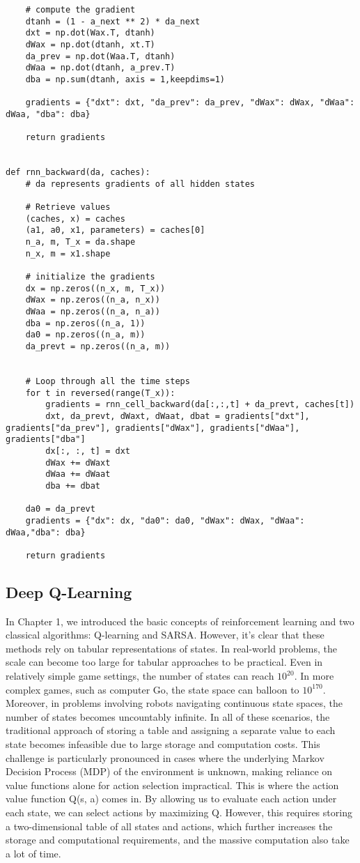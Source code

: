 \documentclass{article}
\begin{document}
\begin{lstlisting}
    # compute the gradient
    dtanh = (1 - a_next ** 2) * da_next
    dxt = np.dot(Wax.T, dtanh)
    dWax = np.dot(dtanh, xt.T)
    da_prev = np.dot(Waa.T, dtanh)
    dWaa = np.dot(dtanh, a_prev.T)
    dba = np.sum(dtanh, axis = 1,keepdims=1)

    gradients = {"dxt": dxt, "da_prev": da_prev, "dWax": dWax, "dWaa": dWaa, "dba": dba}

    return gradients


def rnn_backward(da, caches):
    # da represents gradients of all hidden states

    # Retrieve values
    (caches, x) = caches
    (a1, a0, x1, parameters) = caches[0]
    n_a, m, T_x = da.shape
    n_x, m = x1.shape

    # initialize the gradients
    dx = np.zeros((n_x, m, T_x))
    dWax = np.zeros((n_a, n_x))
    dWaa = np.zeros((n_a, n_a))
    dba = np.zeros((n_a, 1))
    da0 = np.zeros((n_a, m))
    da_prevt = np.zeros((n_a, m))


    # Loop through all the time steps
    for t in reversed(range(T_x)):
        gradients = rnn_cell_backward(da[:,:,t] + da_prevt, caches[t])
        dxt, da_prevt, dWaxt, dWaat, dbat = gradients["dxt"], gradients["da_prev"], gradients["dWax"], gradients["dWaa"], gradients["dba"]
        dx[:, :, t] = dxt
        dWax += dWaxt
        dWaa += dWaat
        dba += dbat

    da0 = da_prevt
    gradients = {"dx": dx, "da0": da0, "dWax": dWax, "dWaa": dWaa,"dba": dba}

    return gradients

\end{lstlisting}


\newpage
	\subsection{Deep Q-Learning}

In Chapter 1, we introduced the basic concepts of reinforcement learning and two classical algorithms: Q-learning and SARSA. However, it's clear that these methods rely on tabular representations of states. In real-world problems, the scale can become too large for tabular approaches to be practical. Even in relatively simple game settings, the number of states can reach $10^{20}$. In more complex games, such as computer Go, the state space can balloon to $10^{170}$. Moreover, in problems involving robots navigating continuous state spaces, the number of states becomes uncountably infinite. In all of these scenarios, the traditional approach of storing a table and assigning a separate value to each state becomes infeasible due to large storage and computation costs. This challenge is particularly pronounced in cases where the underlying Markov Decision Process (MDP) of the environment is unknown, making reliance on value functions alone for action selection impractical. This is where the action value function Q(s, a) comes in. By allowing us to evaluate each action under each state, we can select actions by maximizing Q. However, this requires storing a two-dimensional table of all states and actions, which further increases the storage and computational requirements,  and the massive computation also take a lot of time.
\end{document}
